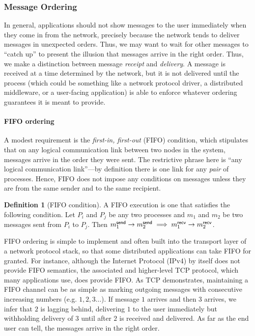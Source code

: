 \documentclass[]             %
{NASA}                       %
\theoremstyle{definition}
\newtheorem{definition}{Definition}[section]
\begin{document}
\subsubsection{Message Ordering}
In general, applications should not show messages to the user
immediately when they come in from the network, precisely because the
network tends to deliver messages in unexpected orders. Thus, we may
want to wait for other messages to ``catch up'' to present the
illusion that messages arrive in the right order. Thus, we make a
distinction between message \emph{receipt} and \emph{delivery}. A
message is received at a time determined by the network, but it is not
delivered until the process (which could be something like a network
protocol driver, a distributed middleware, or a user-facing
application) is able to enforce whatever ordering guarantees it is
meant to provide.

\paragraph{FIFO ordering}
A modest requirement is the \emph{first-in, first-out} (FIFO)
condition, which stipulates that on any logical communication link
between two nodes in the system, messages arrive in the order they
were sent. The restrictive phrase here is ``any logical communication
link''---by definition there is one link for any \emph{pair} of
processes. Hence, FIFO does not impose any conditions on messages
unless they are from the same sender and to the same recipient.

\begin{definition}[FIFO condition]
  \label{def:fifo}
  A FIFO execution is one that satisfies the following condition. Let
  $P_i$ and $P_j$ be any two processes and $m_1$ and $m_2$ be two
  messages sent from $P_i$ to $P_j$. Then
  $m_{1}^{\mathsf{send}} \to m_{2}^{\mathsf{send}} \implies m_{1}^{\mathsf{recv}} \to m_{2}^{\mathsf{recv}}$.
\end{definition}

FIFO ordering is simple to implement and often built into the
transport layer of a network protocol stack, so that some distributed
applications can take FIFO for granted. For instance, although the
Internet Protocol (IPv4) by itself does not provide FIFO semantics,
the associated and higher-level TCP protocol, which many applications
use, does provide FIFO. As TCP demonstrates, maintaining a FIFO
channel can be as simple as marking outgoing messages with consecutive
increasing numbers (e.g. $1,2,3\ldots$). If message $1$ arrives and
then $3$ arrives, we infer that $2$ is lagging behind, delivering $1$
to the user immediately but withholding delivery of $3$ until after
$2$ is received and delivered. As far as the end user can tell, the
messages arrive in the right order.
\end{document}
